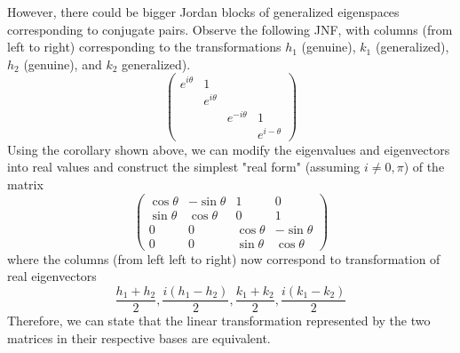   However, there could be bigger Jordan blocks of generalized eigenspaces corresponding to conjugate pairs. Observe the following JNF, with columns (from left to right) corresponding to the transformations $h_1$ (genuine), $k_1$ (generalized), $h_2$ (genuine), and $k_2$ generalized). 
  \[\begin{pmatrix}
  e^{i \theta} & 1 & & \\
  & e^{i \theta} & & \\
  & & e^{-i \theta} & 1 \\
  & & & e^{i- \theta}
  \end{pmatrix}\]
  Using the corollary shown above, we can modify the eigenvalues and eigenvectors into real values and construct the simplest "real form" (assuming $i \neq 0, \pi$) of the matrix 
  \[\begin{pmatrix}
  \cos{\theta} & - \sin{\theta} & 1 & 0 \\
  \sin{\theta} & \cos{\theta} & 0 & 1 \\
  0 & 0 & \cos{\theta} & - \sin{\theta} \\
  0 & 0 & \sin{\theta} & \cos{\theta}
  \end{pmatrix}\]
  where the columns (from left left to right) now correspond to transformation of real eigenvectors
  \[\frac{h_1 + h_2}{2}, \frac{i(h_1 - h_2)}{2}, \frac{k_1 + k_2}{2}, \frac{i(k_1 - k_2)}{2}\]
  Therefore, we can state that the linear transformation represented by the two matrices in their respective bases are equivalent. 

